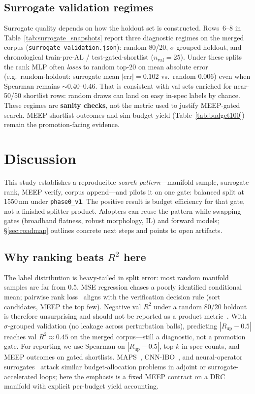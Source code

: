 \documentclass[11pt,a4paper]{article}
\begin{document}
\subsection{Surrogate validation regimes}

Surrogate quality depends on how the holdout set is constructed.
Rows~6--8 in Table~\ref{tab:surrogate_snapshots} report three diagnostic regimes on the merged corpus (\texttt{surrogate\_validation.json}): random 80/20, $\sigma$-grouped holdout, and chronological train-pre-AL / test-gated-shortlist ($n_{\mathrm{val}}{=}25$).
Under these splits the rank MLP often \emph{loses} to random top-20 on mean absolute error (e.g.\ random-holdout: surrogate mean $|{\mathrm{err}}|{=}0.102$ vs.\ random $0.006$) even when Spearman remains $\sim$0.40--0.46.
That is consistent with val sets enriched for near-50/50 shortlist rows: random draws can land on easy in-spec labels by chance.
These regimes are \textbf{sanity checks}, not the metric used to justify MEEP-gated search.
MEEP shortlist outcomes and sim-budget yield (Table~\ref{tab:budget100}) remain the promotion-facing evidence.

\section{Discussion}
\label{sec:discussion}

This study establishes a reproducible \emph{search pattern}---manifold sample, surrogate rank, MEEP verify, corpus append---and pilots it on one gate: balanced split at 1550\,nm under \texttt{phase0\_v1}.
The positive result is budget efficiency for that gate, not a finished splitter product.
Adopters can reuse the pattern while swapping gates (broadband flatness, robust morphology, IL) and forward models; \S\ref{sec:roadmap} outlines concrete next steps and points to open artifacts.

\subsection{Why ranking beats $R^2$ here}

The label distribution is heavy-tailed in split error: most random manifold samples are far from 0.5.
MSE regression chases a poorly identified conditional mean; pairwise rank loss~\cite{Burges2010LambdaRank} aligns with the verification decision rule (sort candidates, MEEP the top few).
Negative val $R^2$ under a random 80/20 holdout is therefore unsurprising and should not be reported as a product metric~\cite{Jiang2021SurrogateReview}.
With $\sigma$-grouped validation (no leakage across perturbation balls), predicting $|R_{\mathrm{up}}-0.5|$ reaches val $R^2 \approx 0.45$ on the merged corpus---still a diagnostic, not a promotion gate.
For reporting we use Spearman on $|R_{\mathrm{up}}-0.5|$, top-$k$ in-spec counts, and MEEP outcomes on gated shortlists.
MAPS~\cite{MAPS2025}, CNN-IBO~\cite{SciRep2025CNNIBO}, and neural-operator surrogates~\cite{Frenkel2023NeuralOperator} attack similar budget-allocation problems in adjoint or surrogate-accelerated loops; here the emphasis is a fixed MEEP contract on a DRC manifold with explicit per-budget yield accounting.
\end{document}
